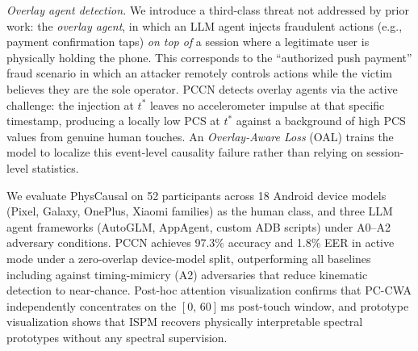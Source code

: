 \textit{Overlay agent detection.}
We introduce a third-class threat not addressed by prior work: the \textit{overlay agent},
in which an LLM agent injects fraudulent actions (e.g., payment confirmation taps)
\textit{on top of} a session where a legitimate user is physically holding the phone.%
This corresponds to the ``authorized push payment'' fraud scenario in which an attacker
remotely controls actions while the victim believes they are the sole operator.%
PCCN detects overlay agents via the active challenge: the injection at $t^*$ leaves no
accelerometer impulse at that specific timestamp, producing a locally low PCS at $t^*$
against a background of high PCS values from genuine human touches.%
An \textit{Overlay-Aware Loss} (OAL) trains the model to localize this event-level
causality failure rather than relying on session-level statistics.%

We evaluate PhysCausal on 52 participants across 18 Android device models
(Pixel, Galaxy, OnePlus, Xiaomi families) as the human class, and three LLM agent
frameworks (AutoGLM, AppAgent, custom ADB scripts) under A0--A2 adversary conditions.%
PCCN achieves 97.3\% accuracy and 1.8\% EER in active mode under a zero-overlap
device-model split, outperforming all baselines including against timing-mimicry (A2)
adversaries that reduce kinematic detection to near-chance.%
Post-hoc attention visualization confirms that PC-CWA independently concentrates on the
$[0,\,60]$\,ms post-touch window, and prototype visualization shows that ISPM recovers
physically interpretable spectral prototypes without any spectral supervision.%

